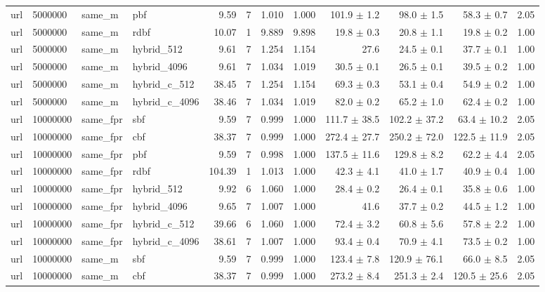 \begin{tabular}{llllrrrrrrrr}
url & 5000000 & same\_m & pbf & 9.59 & 7 & 1.010 & 1.000 & 101.9 $\pm$ 1.2 & 98.0 $\pm$ 1.5 & 58.3 $\pm$ 0.7 & 2.05 \\
url & 5000000 & same\_m & rdbf & 10.07 & 1 & 9.889 & 9.898 & 19.8 $\pm$ 0.3 & 20.8 $\pm$ 1.1 & 19.8 $\pm$ 0.2 & 1.00 \\
url & 5000000 & same\_m & hybrid\_512 & 9.61 & 7 & 1.254 & 1.154 & 27.6 & 24.5 $\pm$ 0.1 & 37.7 $\pm$ 0.1 & 1.00 \\
url & 5000000 & same\_m & hybrid\_4096 & 9.61 & 7 & 1.034 & 1.019 & 30.5 $\pm$ 0.1 & 26.5 $\pm$ 0.1 & 39.5 $\pm$ 0.2 & 1.00 \\
url & 5000000 & same\_m & hybrid\_c\_512 & 38.45 & 7 & 1.254 & 1.154 & 69.3 $\pm$ 0.3 & 53.1 $\pm$ 0.4 & 54.9 $\pm$ 0.2 & 1.00 \\
url & 5000000 & same\_m & hybrid\_c\_4096 & 38.46 & 7 & 1.034 & 1.019 & 82.0 $\pm$ 0.2 & 65.2 $\pm$ 1.0 & 62.4 $\pm$ 0.2 & 1.00 \\
url & 10000000 & same\_fpr & sbf & 9.59 & 7 & 0.999 & 1.000 & 111.7 $\pm$ 38.5 & 102.2 $\pm$ 37.2 & 63.4 $\pm$ 10.2 & 2.05 \\
url & 10000000 & same\_fpr & cbf & 38.37 & 7 & 0.999 & 1.000 & 272.4 $\pm$ 27.7 & 250.2 $\pm$ 72.0 & 122.5 $\pm$ 11.9 & 2.05 \\
url & 10000000 & same\_fpr & pbf & 9.59 & 7 & 0.998 & 1.000 & 137.5 $\pm$ 11.6 & 129.8 $\pm$ 8.2 & 62.2 $\pm$ 4.4 & 2.05 \\
url & 10000000 & same\_fpr & rdbf & 104.39 & 1 & 1.013 & 1.000 & 42.3 $\pm$ 4.1 & 41.0 $\pm$ 1.7 & 40.9 $\pm$ 0.4 & 1.00 \\
url & 10000000 & same\_fpr & hybrid\_512 & 9.92 & 6 & 1.060 & 1.000 & 28.4 $\pm$ 0.2 & 26.4 $\pm$ 0.1 & 35.8 $\pm$ 0.6 & 1.00 \\
url & 10000000 & same\_fpr & hybrid\_4096 & 9.65 & 7 & 1.007 & 1.000 & 41.6 & 37.7 $\pm$ 0.2 & 44.5 $\pm$ 1.2 & 1.00 \\
url & 10000000 & same\_fpr & hybrid\_c\_512 & 39.66 & 6 & 1.060 & 1.000 & 72.4 $\pm$ 3.2 & 60.8 $\pm$ 5.6 & 57.8 $\pm$ 2.2 & 1.00 \\
url & 10000000 & same\_fpr & hybrid\_c\_4096 & 38.61 & 7 & 1.007 & 1.000 & 93.4 $\pm$ 0.4 & 70.9 $\pm$ 4.1 & 73.5 $\pm$ 0.2 & 1.00 \\
url & 10000000 & same\_m & sbf & 9.59 & 7 & 0.999 & 1.000 & 123.4 $\pm$ 7.8 & 120.9 $\pm$ 76.1 & 66.0 $\pm$ 8.5 & 2.05 \\
url & 10000000 & same\_m & cbf & 38.37 & 7 & 0.999 & 1.000 & 273.2 $\pm$ 8.4 & 251.3 $\pm$ 2.4 & 120.5 $\pm$ 25.6 & 2.05 \\

\end{tabular}

